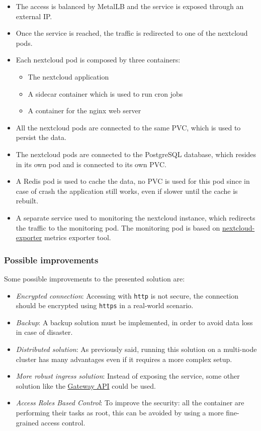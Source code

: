 \begin{itemize}
    \itemsep0em
    \item The access is balanced by MetalLB  and the service is exposed through an external IP.
    \item Once the service is reached, the traffic is redirected to one of the nextcloud pods.
    \item Each nextcloud pod is composed by three containers: 
        \begin{itemize}
            \itemsep0em
            \item The nextcloud application
            \item A sidecar container which is used to run cron jobs
            \item A container for the nginx web server
        \end{itemize}
    \item All the nextcloud pods are connected to the same PVC, which is used to persist the data.
    \item The nextcloud pods are connected to the PostgreSQL database, which resides in its own pod and is connected to its own PVC.
    \item A Redis pod is used to cache the data, no PVC is used for this pod since in case of crash the application still works, even if slower until the cache is rebuilt.
    \item A separate service used to monitoring the nextcloud instance, which redirects the traffic to the monitoring pod. The monitoring pod is based on \href{https://github.com/xperimental/nextcloud-exporter}{nextcloud-exporter} metrics exporter tool. 
\end{itemize}


\subsubsection{Possible improvements}

Some possible improvements to the presented solution are:

\begin{itemize}
    \itemsep0em
    \item \textit{Encrypted connection}: Accessing with \texttt{http} is not secure, the connection should be encrypted using \texttt{https} in a real-world scenario.
    \item \textit{Backup}: A backup solution must be implemented, in order to avoid data loss in case of disaster. 
    \item \textit{Distributed solution}: As previously said, running this solution on a multi-node cluster has many advantages even if it requires a more complex setup.
    \item \textit{More robust ingress solution}: Instead of exposing the service, some other solution like the \href{https://kubernetes.io/docs/concepts/services-networking/gateway/}{Gateway API} could be used.
    \item \textit{Access Roles Based Control}: To improve the security: all the container are performing their tasks as root, this can be avoided by using a more fine-grained access control.
\end{itemize}
